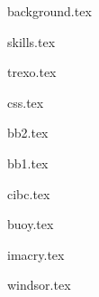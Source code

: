\documentclass[11pt]{article}
\begin{document}
{background.tex}



{skills.tex}



{trexo.tex}

\vspace{0.2cm}

{css.tex}

\vspace{0.2cm}

{bb2.tex}

\vspace{0.2cm}

{bb1.tex}

\vspace{0.2cm}

{cibc.tex}


{buoy.tex}

\vspace{0.2cm}

{imacry.tex}


{windsor.tex}
\end{document}
